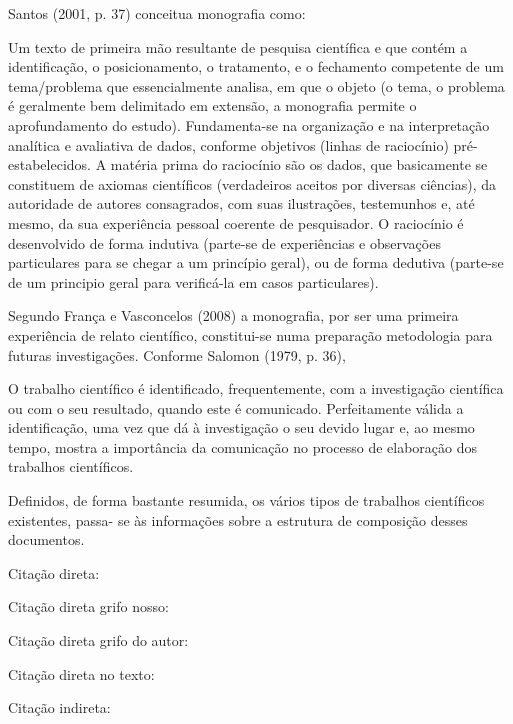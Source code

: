 \begin{Desenvolvimento}
Santos (2001, p. 37) conceitua monografia como:
\begin{citacaodiretalonga}
Um texto de primeira mão resultante de pesquisa científica e que contém a identificação, o posicionamento, o tratamento, e o fechamento competente de um tema/problema que essencialmente analisa, em que o objeto (o tema, o problema é geralmente bem delimitado em extensão, a monografia permite o aprofundamento do estudo). Fundamenta-se na organização e na interpretação analítica e avaliativa de dados, conforme objetivos (linhas de raciocínio) pré-estabelecidos. A matéria prima do raciocínio são os dados, que basicamente se constituem de axiomas científicos (verdadeiros aceitos por diversas ciências), da autoridade de autores consagrados, com suas ilustrações, testemunhos e, até mesmo, da sua experiência pessoal coerente de pesquisador. O raciocínio é desenvolvido de forma indutiva (parte-se de experiências e observações particulares para se chegar a um princípio geral), ou de forma dedutiva (parte-se de um principio geral para verificá-la em casos particulares).
\end{citacaodiretalonga}

Segundo França e Vasconcelos (2008) a monografia, por ser uma primeira experiência de relato científico, constitui-se numa preparação metodologia para futuras investigações. Conforme Salomon (1979, p. 36),

\begin{citacaodiretalonga}
O trabalho científico é identificado, frequentemente, com a investigação científica ou com o seu resultado, quando este é comunicado. Perfeitamente válida a identificação, uma vez que dá à investigação o seu devido lugar e, ao mesmo tempo, mostra a importância da comunicação no processo de elaboração dos trabalhos científicos.
\end{citacaodiretalonga}

Definidos, de forma bastante resumida, os vários tipos de trabalhos científicos existentes, passa- se às informações sobre a estrutura de composição desses documentos.

Citação direta: 

Citação direta grifo nosso: 

Citação direta grifo do autor: 

Citação direta no texto: 

Citação indireta: 


\end{Desenvolvimento}
